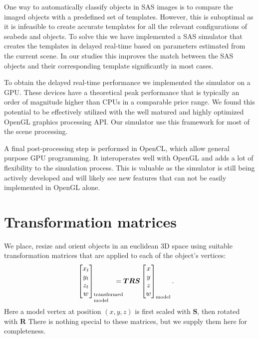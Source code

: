 \documentclass[12pt,journal,draftclsnofoot,onecolumn]{IEEEtran}
\newcommand\bmat[1]{\begin{bmatrix}#1\end{bmatrix}}
\newcommand\mat[1]{\boldsymbol{#1}}
\newcommand\1{\vec 1}
\newcommand*\R{\mat R}
\begin{document}
One way to automatically classify objects in SAS images is to compare the imaged objects with a predefined set of templates. However, this is suboptimal as it is infeasible to create accurate templates for all the relevant configurations of seabeds and objects. To solve this we have implemented a SAS simulator that creates the templates in delayed real-time based on parameters estimated from the current scene. In our studies this improves the match between the SAS objects and their corresponding template significantly in most cases.

To obtain the delayed real-time performance we implemented the simulator on a GPU. These devices have a theoretical peak performance that is typically an order of magnitude higher than CPUs in a comparable price range. We found this potential to be effectively utilized with the well matured and highly optimized OpenGL graphics processing API. Our simulator use this framework for most of the scene processing.

A final post-processing step is performed in OpenCL, which allow general purpose GPU programming. It interoperates well with OpenGL and adds a lot of flexibility to the simulation process. This is valuable as the simulator is still being actively developed and will likely see new features that can not be easily implemented in OpenGL alone.

\appendix

\section{Transformation matrices}\label{transformation_matrices} 
We place, resize and orient objects in an euclidean 3D space using suitable transformation matrices that are applied to each of the object's vertices:
\begin{align}
\bmat{x_t \\ y_t \\ z_t \\ w}_\text{\parbox{1cm}{\setlength\baselineskip{0.3cm}transformed\\model}} &= \boldsymbol{T}\R\boldsymbol{S} \bmat{x \\ y \\ z \\ w}_\text{model}.
\end{align}
Here a model vertex at position $(x,y,z)$ is first scaled with $\boldsymbol{S}$, then rotated with $\R$
There is nothing special to these matrices, but we supply them here for completeness.
\end{document}
